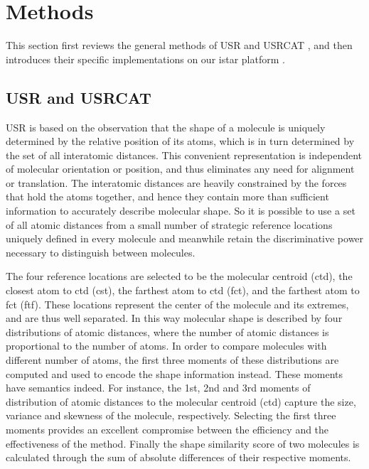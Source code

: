 \section{Methods}

This section first reviews the general methods of USR \citep{1379} and USRCAT \citep{1331}, and then introduces their specific implementations on our istar platform \citep{1362}.

\subsection{USR and USRCAT}

USR is based on the observation that the shape of a molecule is uniquely determined by the relative position of its atoms, which is in turn determined by the set of all interatomic distances. This convenient representation is independent of molecular orientation or position, and thus eliminates any need for alignment or translation. The interatomic distances are heavily constrained by the forces that hold the atoms together, and hence they contain more than sufficient information to accurately describe molecular shape. So it is possible to use a set of all atomic distances from a small number of strategic reference locations uniquely defined in every molecule and meanwhile retain the discriminative power necessary to distinguish between molecules.

The four reference locations are selected to be the molecular centroid (ctd), the closest atom to ctd (cst), the farthest atom to ctd (fct), and the farthest atom to fct (ftf). These locations represent the center of the molecule and its extremes, and are thus well separated. In this way molecular shape is described by four distributions of atomic distances, where the number of atomic distances is proportional to the number of atoms. In order to compare molecules with different number of atoms, the first three moments of these distributions are computed and used to encode the shape information instead. These moments have semantics indeed. For instance, the 1st, 2nd and 3rd moments of distribution of atomic distances to the molecular centroid (ctd) capture the size, variance and skewness of the molecule, respectively. Selecting the first three moments provides an excellent compromise between the efficiency and the effectiveness of the method. Finally the shape similarity score of two molecules is calculated through the sum of absolute differences of their respective moments.

